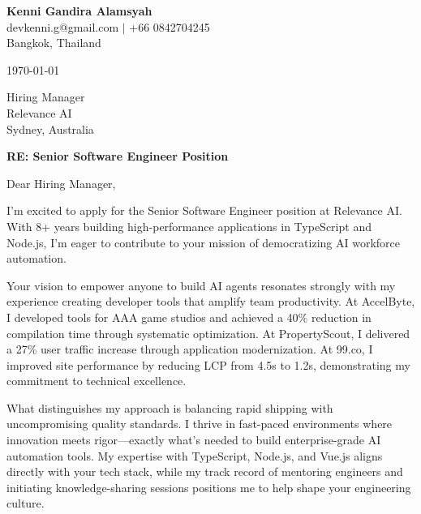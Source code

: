 \documentclass[11pt]{article}
\begin{document}
\begin{flushleft}
\textbf{\Large Kenni Gandira Alamsyah}\\
\vspace{4pt}
devkenni.g@gmail.com $|$ +66 0842704245\\
Bangkok, Thailand\\
\end{flushleft}

\vspace{12pt}

\today

\vspace{12pt}

\begin{flushleft}
Hiring Manager\\
Relevance AI\\
Sydney, Australia\\
\end{flushleft}

\vspace{12pt}

\textbf{RE: Senior Software Engineer Position}

\vspace{12pt}

Dear Hiring Manager,

\vspace{8pt}

I'm excited to apply for the Senior Software Engineer position at Relevance AI. With 8+ years building high-performance applications in TypeScript and Node.js, I'm eager to contribute to your mission of democratizing AI workforce automation.

\vspace{8pt}

Your vision to empower anyone to build AI agents resonates strongly with my experience creating developer tools that amplify team productivity. At AccelByte, I developed tools for AAA game studios and achieved a 40\% reduction in compilation time through systematic optimization. At PropertyScout, I delivered a 27\% user traffic increase through application modernization. At 99.co, I improved site performance by reducing LCP from 4.5s to 1.2s, demonstrating my commitment to technical excellence.

\vspace{8pt}

What distinguishes my approach is balancing rapid shipping with uncompromising quality standards. I thrive in fast-paced environments where innovation meets rigor---exactly what's needed to build enterprise-grade AI automation tools. My expertise with TypeScript, Node.js, and Vue.js aligns directly with your tech stack, while my track record of mentoring engineers and initiating knowledge-sharing sessions positions me to help shape your engineering culture.
\end{document}
